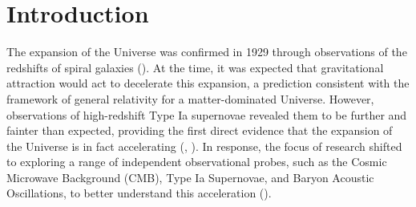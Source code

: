 \section{Introduction}


The expansion of the Universe was confirmed in 1929 through observations of the redshifts of spiral galaxies (\cite{hubbleRelationDistanceRadial1929a}). At the time, it was expected that gravitational attraction would act to decelerate this expansion, a prediction consistent with the framework of general relativity for a matter-dominated Universe. However, observations of high-redshift Type Ia supernovae revealed them to be further and fainter than expected, providing the first direct evidence that the expansion of the Universe is in fact accelerating (\cite{perlmutterDiscoverySupernovaExplosion1998a}, \cite{riessObservationalEvidenceSupernovae1998}). In response, the focus of research shifted to exploring a range of independent observational probes, such as the Cosmic Microwave Background (CMB), Type Ia Supernovae, and Baryon Acoustic Oscillations, to better understand this acceleration (\cite{abdallaCosmologyIntertwinedReview2022}). 

